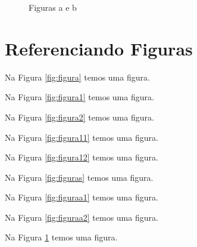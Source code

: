 \documentclass[12pt,a4paper]{article}
\begin{document}
\begin{figure}[H]
    \caption{Figuras a e b}
    \label{fig:figuraaeb}
\end{figure}

\section{Referenciando Figuras}

Na Figura \ref{fig:figura} temos uma figura.

Na Figura \ref{fig:figura1} temos uma figura.

Na Figura \ref{fig:figura2} temos uma figura.

Na Figura \ref{fig:figura11} temos uma figura.

Na Figura \ref{fig:figura12} temos uma figura.

Na Figura \ref{fig:figuras} temos uma figura.

Na Figura \ref{fig:figuraa1} temos uma figura.

Na Figura \ref{fig:figuraa2} temos uma figura.

Na Figura \ref{fig:figuraaeb} temos uma figura.
\end{document}
